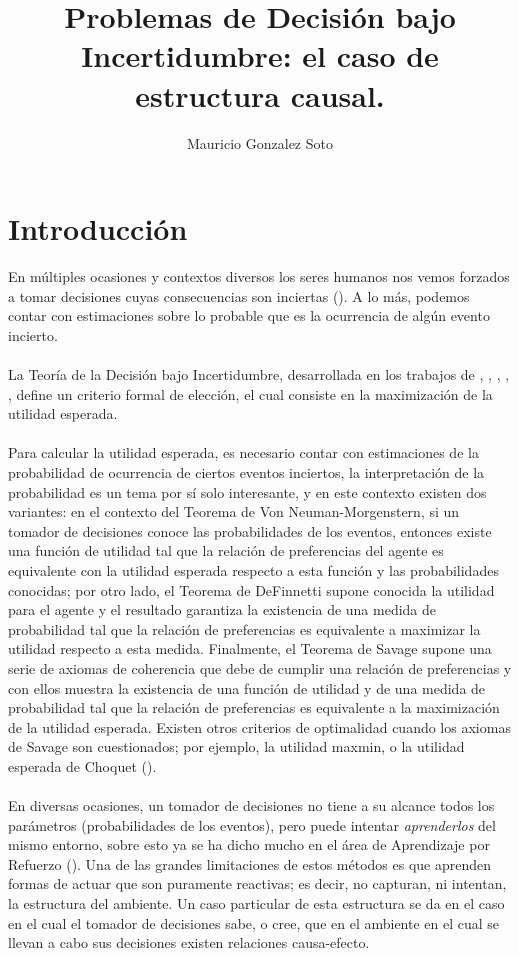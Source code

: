 \documentclass[11pt]{article}
\title{Problemas de Decisión bajo Incertidumbre: el caso de estructura causal.}
\author{Mauricio Gonzalez Soto}
\theoremstyle{plain}
\begin{document}
\maketitle
\section{Introducción}
En múltiples ocasiones y contextos diversos los seres humanos nos vemos forzados a tomar decisiones cuyas consecuencias son inciertas (\cite{danks2014unifying}). A lo más, podemos contar con estimaciones sobre lo probable que es la ocurrencia de algún evento incierto.\\
\\
La Teoría de la Decisión bajo Incertidumbre, desarrollada en los trabajos de \cite{von1944theory}, \cite{definetti1930}, \cite{definetti1937}, \cite{savage1954the}, \cite{bernardo2000bayesian}, define un criterio formal de elección, el cual consiste en la maximización de la utilidad esperada.\\
\\
Para calcular la utilidad esperada, es necesario contar con estimaciones de la probabilidad de ocurrencia de ciertos eventos inciertos, la interpretación de la probabilidad es un tema por sí solo interesante, y en este contexto existen dos variantes: en el contexto del Teorema de Von Neuman-Morgenstern, si un tomador de decisiones conoce las probabilidades de los eventos, entonces existe una función de utilidad tal que la relación de preferencias del agente es equivalente con la utilidad esperada respecto a esta función y las probabilidades conocidas; por otro lado, el Teorema de DeFinnetti supone conocida la utilidad para el agente y el resultado garantiza la existencia de una medida de probabilidad tal que la relación de preferencias es equivalente a maximizar la utilidad respecto a esta medida. Finalmente, el Teorema de Savage supone una serie de axiomas de coherencia que debe de cumplir una relación de preferencias y con ellos muestra la existencia de una función de utilidad y de una medida de probabilidad tal que la relación de preferencias es equivalente a la maximización de la utilidad esperada. Existen otros criterios de optimalidad cuando los axiomas de Savage son cuestionados; por ejemplo, la utilidad maxmin, o la utilidad esperada de Choquet (\cite{gilboa2009decision}).\\
\\
En diversas ocasiones, un tomador de decisiones no tiene a su alcance todos los parámetros (probabilidades de los eventos), pero puede intentar \textit{aprenderlos} del mismo entorno, sobre esto ya se ha dicho mucho en el área de Aprendizaje por Refuerzo (\cite{sutton1998reinforcement}). Una de las grandes limitaciones de estos métodos es que aprenden formas de actuar que son puramente reactivas; es decir, no capturan, ni intentan, la estructura del ambiente. Un caso particular de esta estructura se da en el caso en el cual el tomador de decisiones sabe, o cree, que en el ambiente en el cual se llevan a cabo sus decisiones existen relaciones causa-efecto.
\end{document}
